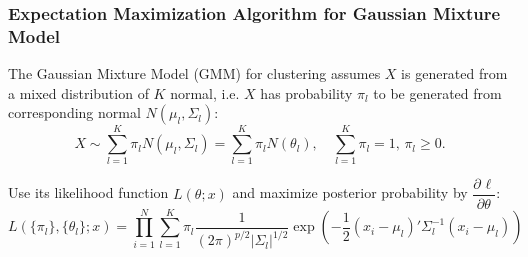     


\subsubsection{Expectation Maximization Algorithm for Gaussian Mixture Model}\label{SubSubSectionEMAlgorithmForGMM}


        The Gaussian Mixture Model (GMM) for clustering assumes $ X $ is generated from a mixed distribution of $ K $ normal, i.e. $ X $ has probability $ \pi_l $ to be generated from corresponding normal $ N(\mu _l,\Sigma _l) $:
    \begin{equation}
        X\sim \sum_{l=1}^K\pi_lN(\mu_l,\Sigma _l)=\sum_{l=1}^K\pi_lN(\theta _l),\quad \sum_{l=1}^K\pi_l=1,\,\pi_l\geq 0.
    \end{equation}
    
    Use its likelihood function $ L(\theta;x) $ and maximize posterior probability by $ \dfrac{\partial^{} \ell}{\partial \theta ^{}} $:
    \begin{equation}
        L(\{\pi_l\},\{\theta_l \};x)=\prod_{i=1}^N \sum_{l=1}^K\pi_l   \dfrac{1}{(2\pi)^{p/2}|\Sigma _l|^{1/2}}\exp\left(   -\dfrac{1}{2}(x_i-\mu _l)'\Sigma^{-1} _l(x_i-\mu _l)\right)
    \end{equation}
    
